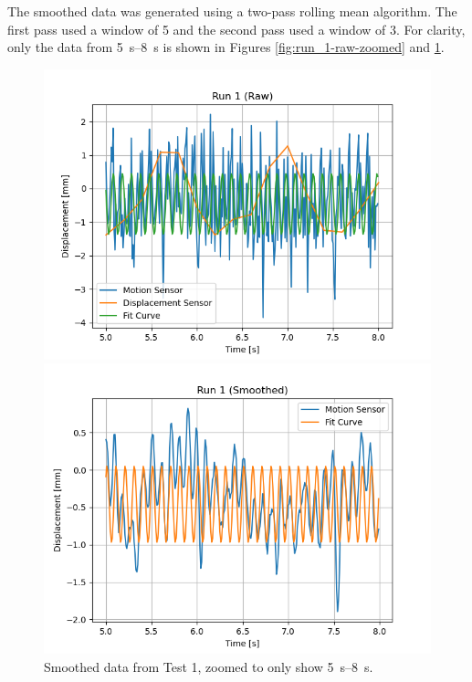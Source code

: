\documentclass[12 pt]{report}
\begin{document}
The smoothed data was generated using a two-pass rolling mean algorithm. The first pass used a window of \num{5} and the second pass used a window of \num{3}. For clarity, only the data from \qtyrange{5}{8}{\s} is shown in Figures \ref{fig:run_1-raw-zoomed} and \ref{fig:run_1-smoothed-zoomed}.

\begin{figure}[htbp]
    \centering
    \begin{minipage}{0.45\textwidth}
        \centering
        \includegraphics[width=1.0\textwidth]{images/Graphs/Run_1-Raw-Zoomed} %
        \caption{Raw data from Test \num{1}, zoomed to only show \qtyrange{5}{8}{\s}.}
        \label{fig:run_1-raw-zoomed}
    \end{minipage}\hfill
    \begin{minipage}{0.45\textwidth}
        \centering
        \includegraphics[width=1.0\textwidth]{images/Graphs/Run_1-Smoothed-Zoomed} %
        \caption{Smoothed data from Test \num{1}, zoomed to only show \qtyrange{5}{8}{\s}.}
        \label{fig:run_1-smoothed-zoomed}
    \end{minipage}
\end{figure}
\end{document}
